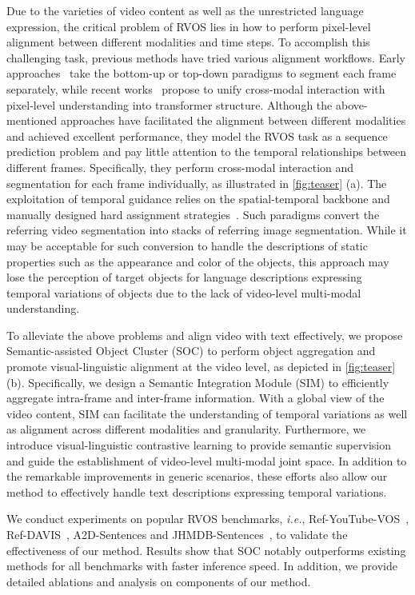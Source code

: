 \documentclass{article}
\begin{document}
Due to the varieties of video content as well as the unrestricted language expression, the critical problem of RVOS lies in how to perform pixel-level alignment between different modalities and time steps.
To accomplish this challenging task, previous methods have tried various alignment workflows. Early approaches~\cite{vlt,GKC,bottom2,top1,bottom3,simbaseline,bottom4} take the bottom-up or top-down paradigms to segment each frame separately, while recent works~\cite{mttr, referformer} propose to unify cross-modal interaction with pixel-level understanding into transformer structure. 
Although the above-mentioned approaches have facilitated the alignment between different modalities and achieved excellent performance, they model the RVOS task as a sequence prediction problem and pay little attention to the temporal relationships between different frames. Specifically, they perform cross-modal interaction and segmentation for each frame individually, as illustrated in \cref{fig:teaser} (a). The exploitation of temporal guidance relies on the spatial-temporal backbone and manually designed hard assignment strategies~\cite{mttr,referformer}.
Such paradigms convert the referring video segmentation into stacks of referring image segmentation. 
While it may be acceptable for such conversion to handle the descriptions of static properties such as the appearance and color of the objects, this approach may lose the perception of target objects  for language descriptions expressing temporal variations of objects due to the lack of video-level multi-modal understanding.


To alleviate the above problems and align video with text effectively, we propose Semantic-assisted Object Cluster (SOC) to perform object aggregation and promote  visual-linguistic alignment at the video level, as depicted in \cref{fig:teaser} (b).
Specifically, we design a Semantic Integration Module (SIM) to efficiently aggregate intra-frame and inter-frame information. With a global view of the video content, SIM can facilitate the understanding of temporal variations as well as alignment across different modalities and granularity.
Furthermore, we introduce visual-linguistic contrastive learning to provide semantic supervision and guide the establishment of video-level multi-modal joint space. 
In addition to the remarkable improvements in generic scenarios, these efforts also allow our method to effectively handle text descriptions expressing temporal variations.

We conduct experiments on popular RVOS benchmarks, \textit{i.e.}, Ref-YouTube-VOS~\cite{urvos}, Ref-DAVIS~\cite{davis}, A2D-Sentences and JHMDB-Sentences~\cite{GavrilyukGLS18}, to validate the effectiveness of our method.
Results show that SOC notably outperforms existing methods for all benchmarks with  faster inference speed.
In addition, we provide detailed ablations and analysis on components of our method.
\end{document}
